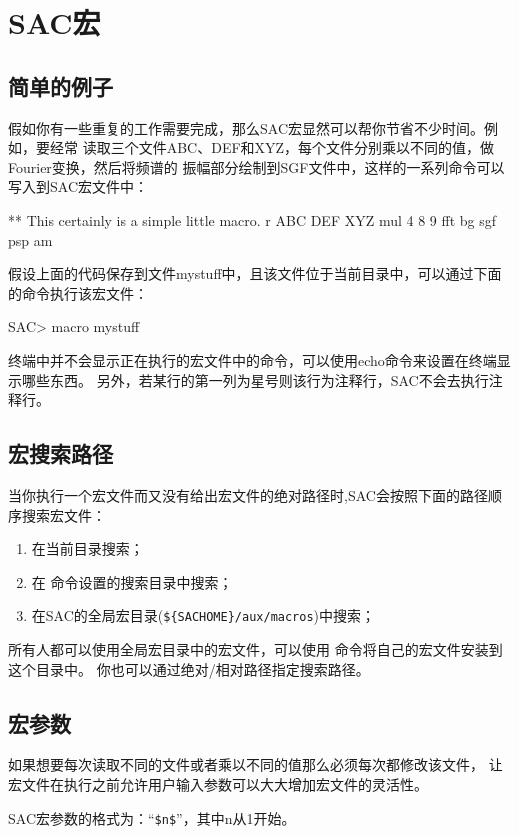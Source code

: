 \section{SAC宏}
\label{sec:macros}

\subsection{简单的例子}
假如你有一些重复的工作需要完成，那么SAC宏显然可以帮你节省不少时间。例如，要经常
读取三个文件ABC、DEF和XYZ，每个文件分别乘以不同的值，做Fourier变换，然后将频谱的
振幅部分绘制到SGF文件中，这样的一系列命令可以写入到SAC宏文件中：
\begin{SACCode}
** This certainly is a simple little macro.
r ABC DEF XYZ
mul 4 8 9
fft
bg sgf
psp am
\end{SACCode}

假设上面的代码保存到文件mystuff中，且该文件位于当前目录中，可以通过下面的命令执行该宏文件：
\begin{SACCode}
SAC> macro mystuff
\end{SACCode}
终端中并不会显示正在执行的宏文件中的命令，可以使用echo命令来设置在终端显示哪些东西。
另外，若某行的第一列为星号则该行为注释行，SAC不会去执行注释行。

\subsection{宏搜索路径}
当你执行一个宏文件而又没有给出宏文件的绝对路径时,SAC会按照下面的路径顺序搜索宏文件：
\begin{enumerate}
\item 在当前目录搜索；
\item 在  命令设置的搜索目录中搜索；
\item 在SAC的全局宏目录(\verb|${SACHOME}/aux/macros|)中搜索；
\end{enumerate}

所有人都可以使用全局宏目录中的宏文件，可以使用  命令将自己的宏文件安装到这个目录中。
你也可以通过绝对/相对路径指定搜索路径。

\subsection{宏参数}
如果想要每次读取不同的文件或者乘以不同的值那么必须每次都修改该文件，
让宏文件在执行之前允许用户输入参数可以大大增加宏文件的灵活性。

SAC宏参数的格式为：``\verb|$n$|''，其中n从1开始。

